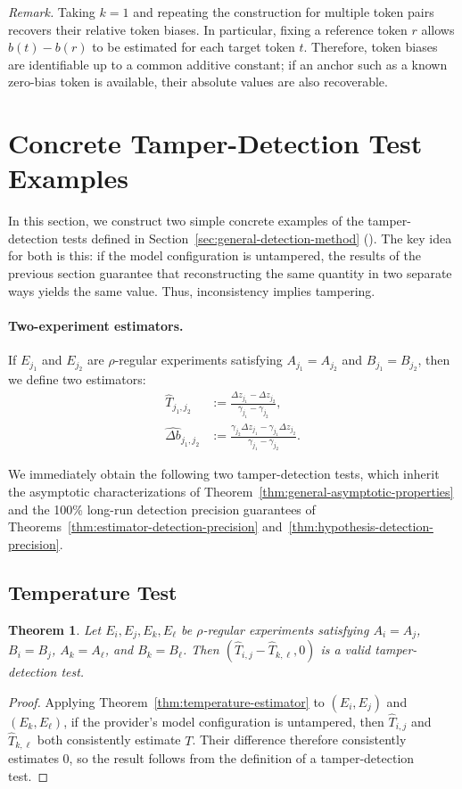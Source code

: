 \documentclass{article}
\newtheorem{theorem}{Theorem}
\begin{document}
\emph{Remark.} Taking $k=1$ and repeating the construction for multiple token
pairs recovers their relative token biases. In particular, fixing a reference
token $r$ allows $b(t)-b(r)$ to be estimated for each target token $t$.
Therefore, token biases are identifiable up to a common additive constant; if
an anchor such as a known zero-bias token is available, their absolute values
are also recoverable.

\section{Concrete Tamper-Detection Test Examples}
\label{sec:concrete-tamper-detection-test-examples}
In this section, we construct two simple concrete examples of the tamper-detection tests defined in Section~\ref{sec:general-detection-method} (). The key idea for both is this: if the model configuration is untampered, the results of the previous section guarantee that reconstructing the same quantity in two separate ways yields the same value. Thus, inconsistency implies tampering.

\paragraph{Two-experiment estimators.}
If $E_{j_1}$ and $E_{j_2}$ are $\rho$-regular experiments satisfying
$A_{j_1}=A_{j_2}$ and $B_{j_1}=B_{j_2}$, then we define two estimators:
\begin{align*}
\widehat{T}_{j_1,j_2}
&:=\frac{\Delta z_{j_1}-\Delta z_{j_2}}
        {\gamma_{j_1}-\gamma_{j_2}},\\
\widehat{\Delta b}_{j_1,j_2}
&:=\frac{\gamma_{j_2}\Delta z_{j_1}-\gamma_{j_1}\Delta z_{j_2}}
        {\gamma_{j_1}-\gamma_{j_2}}.
\end{align*}

We immediately obtain the following two tamper-detection tests, which inherit
the asymptotic characterizations of
Theorem~\ref{thm:general-asymptotic-properties} and the 100\% long-run
detection precision guarantees of
Theorems~\ref{thm:estimator-detection-precision}
and~\ref{thm:hypothesis-detection-precision}.

\subsection{Temperature Test}

\begin{theorem}
\label{thm:temperature-test}
Let $E_i,E_j,E_k,E_\ell$ be $\rho$-regular experiments satisfying
$A_i=A_j$, $B_i=B_j$, $A_k=A_\ell$, and $B_k=B_\ell$. Then
$(\widehat{T}_{i,j}-\widehat{T}_{k,\ell},0)$ is a valid tamper-detection test.
\end{theorem}
\begin{proof}
Applying Theorem~\ref{thm:temperature-estimator} to $(E_i,E_j)$ and
$(E_k,E_\ell)$, if the provider's model configuration is untampered, then
$\widehat{T}_{i,j}$ and $\widehat{T}_{k,\ell}$ both consistently estimate $T$.
Their difference therefore consistently estimates $0$, so the result follows
from the definition of a tamper-detection test.
\end{proof}
\end{document}
